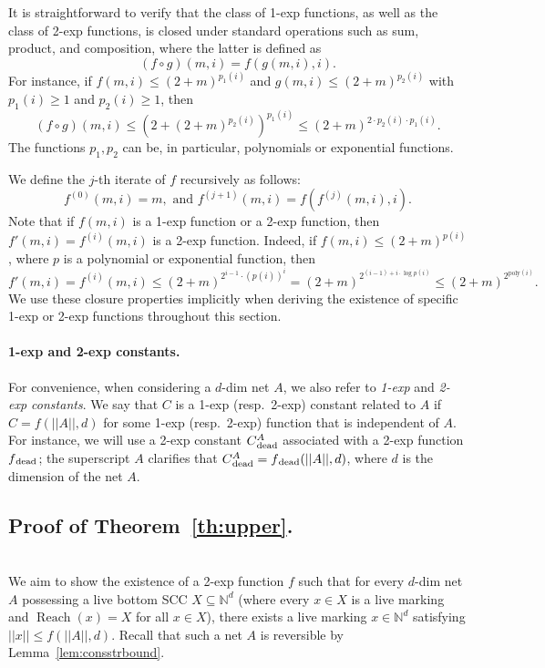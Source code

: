 \documentclass[11pt,a4paper]{amsart}
\DeclareMathOperator{\Reach}{Reach}
\newcommand{\nnorm}[1]{||#1||}
\newcommand{\dead}{{}_\textnormal{dead}}
\newcommand{\Nat}{\mathbb{N}}
\newcommand{\setN}{\Nat}
\theoremstyle{plain}
\theoremstyle{definition}
\theoremstyle{defC}
\theoremstyle{thmC}
\begin{document}
It is straightforward to verify that the class of 1-exp functions, as
well as  the class of 2-exp functions, 
 is
closed under standard operations such as sum, product, and
composition, where the latter is
defined as \[(f\circ g)(m,i)=f(g(m,i),i).\]
For instance, if $f(m,i)\leq	(2+m)^{{p_1(i)}}$
and 
 $g(m,i)\leq	(2+m)^{{p_2(i)}}$ with $p_1(i)\geq 1$ and
 $p_2(i)\geq 1$, then  
\[(f\circ g)(m,i)\leq
\left(2+(2+m)^{{p_2(i)}}\right)^{{p_1(i)}}\leq 
(2+m)^{{2\cdot p_2(i)\cdot p_1(i)}}.\]
The functions $p_1, p_2$
can be, in particular, polynomials or exponential functions.

 We define the $j$-th iterate of $f$ recursively
as follows:
\begin{equation*}
	f^{(0)}(m,i)=m,\text{ and }
f^{(j+1)}(m,i) = f(f^{(j)}(m,i), i).
\end{equation*}
Note that 
if $f(m,i)$ is a 1-exp function or a 2-exp function, then $f'(m,i)=f^{(i)}(m,i)$ 
is a 2-exp function. Indeed,
if $f(m,i)\leq (2+m)^{{p(i)}}$, where $p$ is a polynomial or
exponential function, then
\[f'(m,i)=f^{(i)}(m,i)\leq (2+m)^{2^{i-1}\cdot
(p(i))^i}=(2+m)^{2^{(i-1)+ i\cdot \log
p(i)}}\leq(2+m)^{2^{\text{poly}(i)}}.\]
We use these closure properties
implicitly when deriving the existence of specific 1-exp or 2-exp functions 
throughout this section.

\paragraph{1-exp and 2-exp constants.}

For convenience, when considering a $d$-dim net $A$, we also
refer to \emph{1-exp} and \emph{2-exp constants}. We say that $C$ is a 1-exp (resp.~2-exp)
constant related to $A$ if
$C=f(\nnorm{A},d)$ for some 1-exp (resp.~2-exp) function that is independent of $A$.
For instance, we will use a 2-exp constant $C\dead^A$ associated
with a 2-exp function $f\dead$; the superscript $A$ clarifies that 
$C\dead^A=f\dead(\nnorm{A},d)$, where $d$ is the dimension of the net $A$.

\subsection{Proof of
Theorem~\ref{th:upper}.}\label{sec:infproof}
\hfill\\

We aim to show the existence of a 2-exp function $f$ such that for every $d$-dim
net $A$ possessing a live bottom SCC $X\subseteq\setN^d$ (where every
$x\in X$ is a live marking and $\Reach(x)=X$ for all
$x\in X$),
 there exists a live marking
$x\in\setN^d$ satisfying $\nnorm{x}\leq f(\nnorm{A},d)$.
 Recall that 
such a net $A$ is reversible by Lemma~\ref{lem:consstrbound}.
\end{document}

